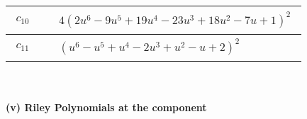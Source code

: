 \documentclass[1p]{elsarticle_modified}
\theoremstyle{definition}
\begin{document}
\begin{tabular}{m{50pt}|m{274pt}}
\hline $$\begin{aligned}c_{10}\end{aligned}$$&$\begin{aligned}
&4(2 u^6-9 u^5+19 u^4-23 u^3+18 u^2-7 u+1)^2
\end{aligned}$\\
\hline $$\begin{aligned}c_{11}\end{aligned}$$&$\begin{aligned}
&(u^6- u^5+u^4-2 u^3+u^2- u+2)^2
\end{aligned}$\\
\hline
\end{tabular}\\~\\
\newpage\renewcommand{\arraystretch}{1}
\flushleft \textbf{(v) Riley Polynomials at the component}\newline \\
\end{document}
